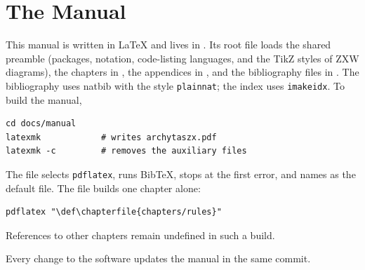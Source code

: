 \section{The Manual}\label{sec:dev-manual}

This manual is written in \LaTeX{} and lives in . Its root file  loads the shared preamble  (packages, notation, code-listing languages, and the TikZ styles of ZXW diagrams), the chapters in , the appendices in , and the bibliography files in . The bibliography uses natbib with the style \texttt{plainnat}; the index uses \texttt{imakeidx}. To build the manual,
\begin{lstlisting}[style=shell]
cd docs/manual
latexmk            # writes archytaszx.pdf
latexmk -c         # removes the auxiliary files
\end{lstlisting}
The file  selects \texttt{pdflatex}, runs BibTeX, stops at the first error, and names  as the default file. The file  builds one chapter alone:
\begin{lstlisting}[style=shell]
pdflatex "\def\chapterfile{chapters/rules}"
\end{lstlisting}
References to other chapters remain undefined in such a build.

Every change to the software updates the manual in the same commit.
